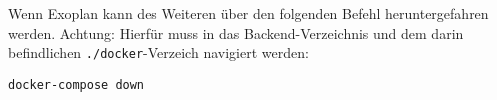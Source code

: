 Wenn Exoplan kann des Weiteren über den folgenden Befehl heruntergefahren werden. Achtung: Hierfür muss in das Backend-Verzeichnis und dem darin befindlichen \texttt{./docker}-Verzeich navigiert werden:

\texttt{docker-compose down}

